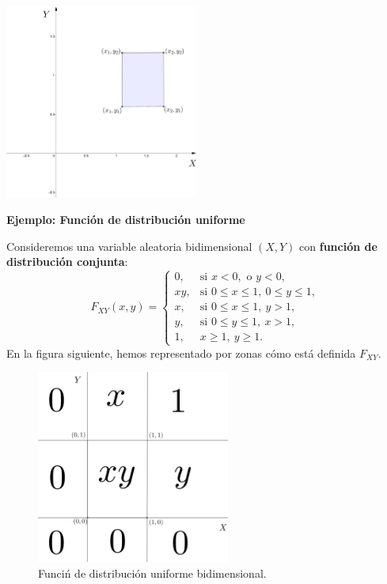 \documentclass[
  letterpaper,
  DIV=11,
  numbers=noendperiod]{scrreprt}
\begin{document}
\includegraphics[width=2.5in,height=\textheight]{Images/Fxy3.png}

\textbf{Ejemplo: Función de distribución uniforme}

Consideremos una variable aleatoria bidimensional \((X,Y)\) con
\textbf{función de distribución conjunta}: \[
F_{XY}(x,y)=\begin{cases}
0, & \mbox{si }x<0,\mbox{ o }y<0,\\
xy, & \mbox{si }0\leq x\leq 1,\ 0\leq y\leq 1, \\
x, & \mbox{si }0\leq x\leq 1,\ y> 1, \\
y, & \mbox{si }0\leq y\leq 1,\ x> 1, \\
1, & x\geq 1,\ y\geq 1.
\end{cases}
\] En la figura siguiente, hemos representado por zonas cómo está
definida \(F_{XY}\).

\begin{figure}

{\centering \includegraphics[width=2.5in,height=\textheight]{Images/FxyEx.png}

}

\caption{Funciń de distribución uniforme bidimensional.}

\end{figure}
\end{document}
